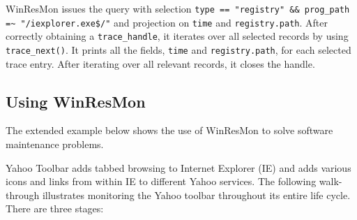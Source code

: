 \begin{itemize}
\noindent

WinResMon issues the query with selection {\small\tt type == "registry" \&\&
prog\_path =\~{} "/iexplorer.exe\$/"} and projection on {\small\tt time} and
{\small\tt registry.path}.  After correctly obtaining a {\small\tt trace\_handle}, it
iterates over all selected records by using {\small\tt trace\_next()}.  It prints
all the fields, {\small\tt time} and {\small\tt registry.path}, for each selected trace
entry.  After iterating over all relevant records, it closes the handle.

\end{itemize}


\subsection{Using WinResMon}

The extended example below shows the use of WinResMon to solve software
maintenance problems.

Yahoo Toolbar adds tabbed browsing to Internet Explorer (IE) and
adds various icons and links from within IE to different Yahoo services.  The
following walk-through illustrates monitoring the Yahoo toolbar throughout its
entire life cycle.  There are three stages:

